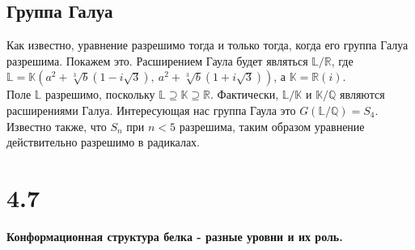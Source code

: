 \documentclass[a4paper,14pt]{article}
\begin{document}
\subsection*{Группа Галуа}
Как известно, уравнение разрешимо тогда и только тогда, когда его группа Галуа разрешима. Покажем это. Расширением Гаула будет являться $\mathbb {L/R}$, где $\mathbb{L} = \mathbb{K}(a ^{2}+\sqrt [3] {b}\left( 1-i\sqrt {3}\right), \: a ^{2}+\sqrt [3] {b}\left( 1+i\sqrt {3}\right)) $, а $\mathbb{K} = \mathbb{R}(i)$.
\\Поле $\mathbb{L}$ разрешимо, поскольку $\mathbb{L} \supseteq \mathbb{K} \supseteq \mathbb{R}$. Фактически, $\mathbb{L/K}$ и $\mathbb{K/Q}$ являются расширениями Галуа. Интересующая нас группа Гаула это $G(\mathbb{L/Q}) = S_4$. Известно также, что $S_n$ при $n < 5$ разрешима, таким образом уравнение действительно разрешимо в радикалах.

\section*{4.7}

\begin{center}
	\LARGE{\textbf{Конформационная структура белка - разные уровни и их роль.}}\\
\end{center}
\end{document}
